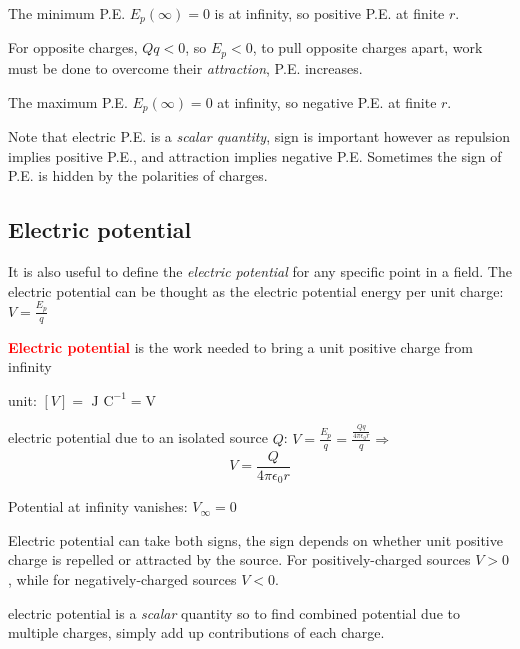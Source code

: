 \documentclass[a4paper,12pt]{book}
\newcommand{\cmt}{}
\newenvironment{ilight}
  {\centering
  	\vspace*{6pt}
  	\begin{tcolorbox}[colframe=Gray,colback=LightGrey!15]
  \setlength{\baselineskip}{\baselineskip}%
  }
  {\end{tcolorbox}\vspace*{-4pt}}
\newcommand{\keypoint}[1]{\textbf{\textcolor{red}{#1}}}
\newcommand{\ec}{4\pi\epsilon_0}
\newcommand{\RA}{\Rightarrow\;}
\newcommand{\tcbhighmath}[1]{\boxed{#1}}
\newcommand{\keypoint}[1]{\textbf{\textcolor{red}{#1}}}
\newcommand{\cmt}{}
\begin{document}
The minimum P.E. $E_p(\infty)=0$ is at infinity, so positive P.E. at finite $r$. 

For opposite charges, $Qq < 0$, so $E_p < 0$, to pull opposite charges apart, work must be done to overcome their \emph{attraction}, P.E. increases.

The maximum P.E. $E_p(\infty)=0$ at infinity, so negative P.E. at finite $r$.

Note that electric P.E. is a \emph{scalar quantity}, sign is important however as repulsion implies positive P.E., and attraction implies negative P.E. Sometimes the sign of P.E. is hidden by the polarities of charges.

	

\subsection{Electric potential}

It is also useful to define the \emph{electric potential} for any specific point in a field. The electric potential can be thought as the electric potential energy per unit charge: $V = \frac{E_p}{q}$

\begin{ilight}
	\keypoint{Electric potential} is the work needed to bring a unit positive charge from infinity
\end{ilight}

\cmt unit: $[V] = \text{ J C}^{-1} = \text{V}$

\cmt electric potential due to an isolated source $Q$: $V = \frac{E_p}{q} = \frac{\frac{Qq}{\ec r}}{q} \RA$ $$\tcbhighmath{V = \frac{Q}{4\pi\epsilon_0 r}}$$

Potential at infinity vanishes: $V_\infty = 0$

Electric potential can take both signs, the sign depends on whether unit positive charge is repelled or attracted by the source. For positively-charged sources $V>0$, while for negatively-charged sources $V<0$. 

\cmt electric potential is a \emph{scalar} quantity so to find combined potential due to multiple charges, simply add up contributions of each charge.

\begin{figure}[ht]
	\centering
\end{figure}
\end{document}
